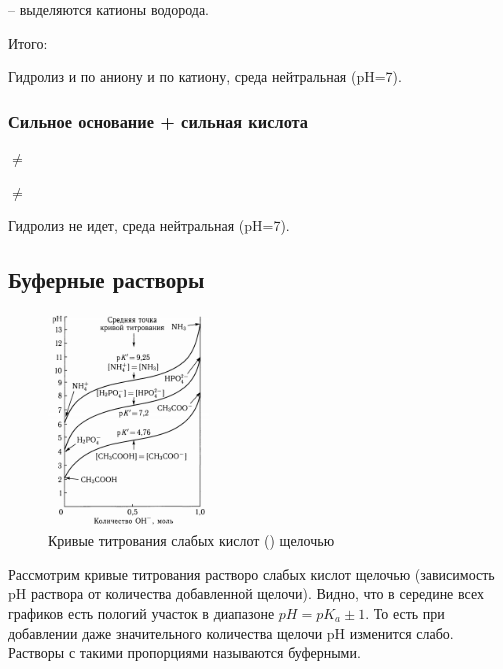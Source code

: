  -- выделяются катионы водорода.

Итого:


Гидролиз и по аниону и по катиону, среда нейтральная (pH=7).

\subsubsection{Сильное основание + сильная кислота}


 $\neq$

 $\neq$

Гидролиз не идет, среда нейтральная (pH=7).
 
 \subsection{Буферные растворы}
 
\begin{figure}
  \begin{center}
    \includegraphics[width=0.38\textwidth]{TeX/Pictures/17_bufcurve.png}
  \end{center}
  \caption{Кривые титрования слабых кислот () щелочью}
\end{figure}
 
 Рассмотрим кривые титрования растворо слабых кислот щелочью (зависимость pH раствора от количества добавленной щелочи). Видно, что в середине всех графиков есть пологий участок в диапазоне $pH = pK_a \pm 1$. То есть при добавлении даже значительного количества щелочи pH изменится слабо. Растворы с такими пропорциями называются буферными. 
 

